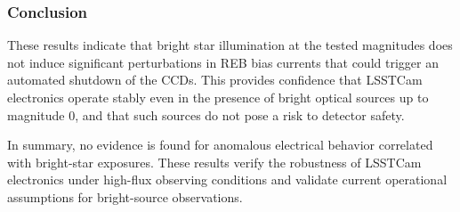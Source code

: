 \subsubsection{Conclusion}

These results indicate that bright star illumination at the tested magnitudes does not induce significant perturbations in REB bias currents that could trigger an automated shutdown of the CCDs. This provides confidence that LSSTCam electronics operate stably even in the presence of bright optical sources up to magnitude 0, and that such sources do not pose a risk to detector safety.

In summary, no evidence is found for anomalous electrical behavior correlated with bright-star exposures. These results verify the robustness of LSSTCam electronics under high-flux observing conditions and validate current operational assumptions for bright-source observations.
